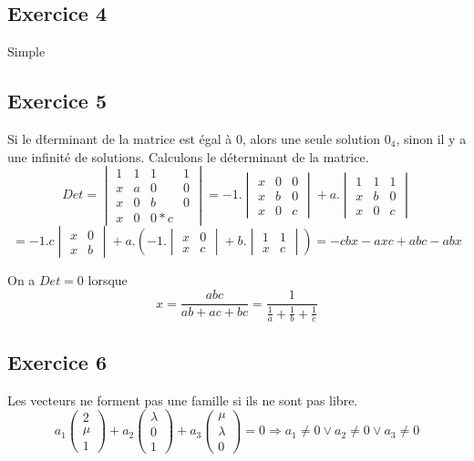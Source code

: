 \documentclass[]{book}
\theoremstyle{definition}
\begin{document}
\subsection*{Exercice 4}
Simple

\subsection*{Exercice 5}
Si le d\'terminant de la matrice est \'egal \`a 0, alors une seule solution $0_4$, sinon il y a une infinit\'e de solutions. Calculons le d\'eterminant de la matrice.
$$
Det = \begin{vmatrix} 1 & 1 & 1 & 1 \\ x & a & 0 & 0 \\ x & 0 & b & 0 \\ x & 0 & 0 * c\end{vmatrix} = 
-1.\begin{vmatrix}  x & 0 & 0 \\ x & b & 0 \\ x & 0 & c \end{vmatrix} + a.\begin{vmatrix}  1 & 1 & 1 \\ x & b & 0 \\ x & 0 & c \end{vmatrix}
$$
$$
= -1.c\begin{vmatrix}  x & 0 \\ x & b \end{vmatrix} + a.\left(-1.\begin{vmatrix}  x & 0 \\ x & c \end{vmatrix} + b.\begin{vmatrix}  1 & 1 \\ x & c \end{vmatrix}\right) =
-cbx - axc + abc -abx
$$

On a $Det=0$ lorsque
$$
x = \frac{abc}{ab+ac+bc} = \frac{1}{\frac{1}{a}+\frac{1}{b}+\frac{1}{c}}
$$

\subsection*{Exercice 6}
Les vecteurs ne forment pas une famille si ils ne sont pas libre.
$$
a_1\begin{pmatrix}2\\\mu\\1\end{pmatrix} + a_2\begin{pmatrix}\lambda \\ 0 \\1 \end{pmatrix} + a_3\begin{pmatrix}\mu\\\lambda\\0\end{pmatrix} = 0
\Rightarrow a_1 \neq 0 \lor a_2 \neq 0 \lor a_3 \neq 0$$
\end{document}
